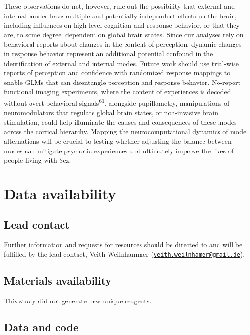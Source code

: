 \documentclass[
]{article}
\begin{document}
These observations do not, however, rule out the possibility that
external and internal modes have multiple and potentially independent
effects on the brain, including influences on high-level cognition and
response behavior, or that they are, to some degree, dependent on global
brain states. Since our analyses rely on behavioral reports about
changes in the content of perception, dynamic changes in response
behavior represent an additional potential confound in the
identification of external and internal modes. Future work should use
trial-wise reports of perception and confidence with randomized response
mappings to enable GLMs that can disentangle perception and response
behavior. No-report functional imaging experiments, where the content of
experiences is decoded without overt behavioral
signals\textsuperscript{61}, alongside pupillometry, manipulations of
neuromodulators that regulate global brain states, or non-invasive brain
stimulation, could help illuminate the causes and consequences of these
modes across the cortical hierarchy. Mapping the neurocomputational
dynamics of mode alternations will be crucial to testing whether
adjusting the balance between modes can mitigate psychotic experiences
and ultimately improve the lives of people living with Scz.

\section{Data availability}\label{data-availability}

\subsection{Lead contact}\label{lead-contact}

Further information and requests for resources should be directed to and
will be fulfilled by the lead contact, Veith Weilnhammer
(\href{mailto:veith.weilnhamer@gmail.de}{\nolinkurl{veith.weilnhamer@gmail.de}}).

\subsection{Materials availability}\label{materials-availability}

This study did not generate new unique reagents.

\subsection{Data and code}\label{data-and-code}
\end{document}
